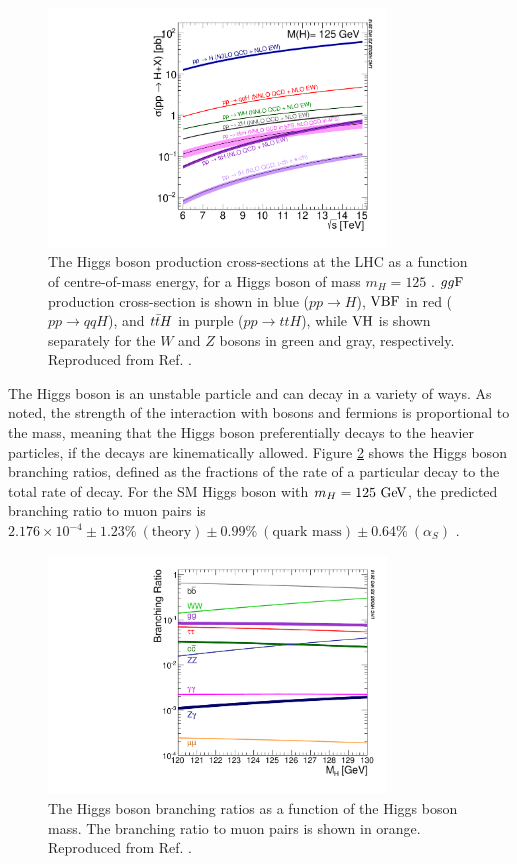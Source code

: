 \begin{figure}[h]
  \centering
  \includegraphics[width=0.8\textwidth]{figures/theory/HiggsProduction}
  \caption[Higgs boson production cross-sections at the LHC]{The Higgs boson production
  cross-sections at the LHC as a function of centre-of-mass energy, for a Higgs boson
  of mass $m_H = 125$ \GeV. $gg\text{F}$ production cross-section is shown in blue
  ($pp \rightarrow H$), $\text{VBF}$ in red ($pp \rightarrow qqH$), and $t\bar{t} H$ in purple
  ($pp \rightarrow ttH$), while $\text{VH}$ is shown separately for the $W$ and $Z$ bosons
  in green and gray, respectively. Reproduced from Ref. \cite{deFlorian:2016spz}.}
   \label{fig:the:prod}
\end{figure}

The Higgs boson is an unstable particle and can decay in a variety of ways. As noted,
the strength of the interaction with bosons and fermions is proportional to the mass,
meaning that the Higgs boson preferentially decays to the heavier particles, if the decays
are kinematically allowed. Figure \ref{fig:the:decay} shows the Higgs boson branching
ratios, defined as the fractions of the rate of a particular decay to the total
rate of decay. For the SM Higgs boson with $m_H = 125~\text{Ge\kern -0.1em V}$, the predicted branching ratio
to muon pairs is $2.176 \times 10^{-4}
\pm 1.23\%~(\text{theory})
\pm 0.99\%~(\text{quark mass})
\pm 0.64\%~(\alpha_S)$ \cite{deFlorian:2016spz}. 

\begin{figure}[h]
  \centering
  \includegraphics[width=0.8\textwidth]{figures/theory/HiggsDecay}
  \caption[Higgs boson branching ratios]{The Higgs boson branching ratios as a function
  of the Higgs boson mass. The branching ratio to muon pairs is shown in orange.
  Reproduced from Ref. \cite{deFlorian:2016spz}.}
   \label{fig:the:decay}
\end{figure}

